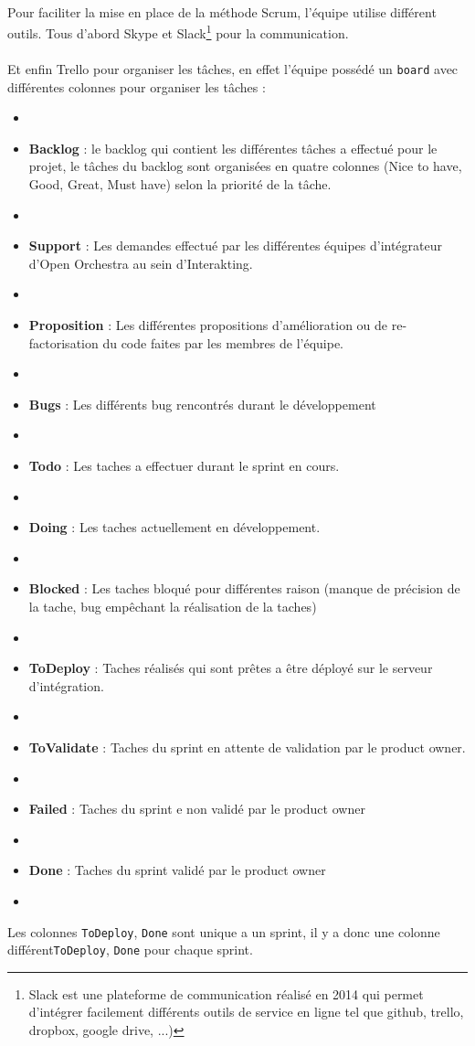  \paragraph{}
 Pour faciliter la mise en place de la méthode Scrum, l'équipe utilise différent outils.
 Tous d'abord Skype et Slack\footnote{Slack est une plateforme de communication réalisé en 2014 qui permet d'intégrer facilement différents outils de service en ligne tel que github, trello, dropbox, google drive, ...)} pour la communication.
  \paragraph{}
 Et enfin Trello pour organiser les tâches, en effet l'équipe possédé un \verb?board? avec différentes colonnes pour organiser les tâches : 
 \begin{itemize}
 \item[]
 \item \textbf{Backlog} : le backlog qui contient les différentes tâches a effectué pour le projet, le tâches du backlog sont organisées en quatre colonnes (Nice to have, Good, Great, Must have) selon la priorité de la tâche.
 \item[]
 \item \textbf{Support} : Les demandes effectué par les différentes équipes d'intégrateur d'Open Orchestra au sein d'Interakting.
\item[]
 \item \textbf{Proposition} : Les différentes propositions d'amélioration ou de re- factorisation du code faites par les membres de l'équipe.
\item[]
 \item \textbf{Bugs} : Les différents bug rencontrés durant le développement
\item[]
 \item \textbf{Todo} : Les taches a effectuer durant le sprint en cours.
\item[]
 \item \textbf{Doing} : Les taches actuellement en développement.
\item[]
 \item \textbf{Blocked} : Les taches bloqué pour différentes raison (manque de précision de la tache, bug empêchant la réalisation de la taches)
\item[]
 \item \textbf{ToDeploy} : Taches réalisés qui sont prêtes a être déployé sur le serveur d'intégration.
\item[]
 \item \textbf{ToValidate} : Taches du sprint en attente de validation par le product owner.
\item[]
 \item \textbf{Failed} : Taches du sprint e non validé par le product owner
\item[]
 \item \textbf{Done} : Taches du sprint validé par le product owner
 \item[]
 \end{itemize}
Les colonnes \verb?ToDeploy?, \verb?Done? sont unique a un sprint, il y a donc une colonne  différent\verb?ToDeploy?, \verb?Done? pour chaque sprint.
